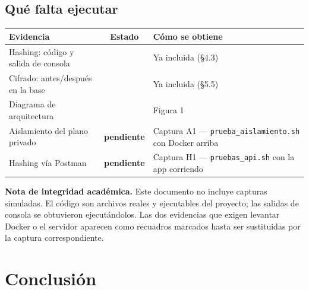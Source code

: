 \documentclass[11pt,letterpaper]{article}
\newcommand{\ok}{\textcolor{qcGreen}{\textbf{\checkmark}}}
\newcommand{\pend}{\textcolor{qcAmber}{\textbf{pendiente}}}
\begin{document}
\subsection{Qué falta ejecutar}

\begin{center}
\small
\begin{tabular}{@{}>{\raggedright\arraybackslash}p{5.2cm} c >{\raggedright\arraybackslash}p{7.0cm}@{}}
\toprule
\textbf{Evidencia} & \textbf{Estado} & \textbf{Cómo se obtiene} \\
\midrule
Hashing: código y salida de consola & \ok & Ya incluida (\S4.3) \\[3pt]
Cifrado: antes/después en la base & \ok & Ya incluida (\S5.5) \\[3pt]
Diagrama de arquitectura & \ok & Figura 1 \\[3pt]
Aislamiento del plano privado & \pend & Captura A1 — \texttt{prueba\_aislamiento.sh} con Docker arriba \\[3pt]
Hashing vía Postman & \pend & Captura H1 — \texttt{pruebas\_api.sh} con la app corriendo \\
\bottomrule
\end{tabular}
\end{center}

\begin{alerta}
\textbf{Nota de integridad académica.} Este documento no incluye capturas
simuladas. El código son archivos reales y ejecutables del proyecto; las
salidas de consola se obtuvieron ejecutándolos. Las dos evidencias que exigen
levantar Docker o el servidor aparecen como recuadros marcados hasta ser
sustituidas por la captura correspondiente.
\end{alerta}

\section{Conclusión}
\end{document}
